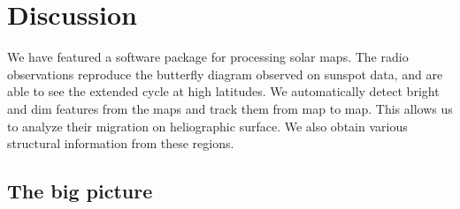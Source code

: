 \documentclass{aa}
\begin{document}
%
%
%

\section{Discussion}\label{sect:discussion}

We have featured a software package for processing solar maps. The radio observations reproduce the butterfly diagram 
observed on sunspot data, and are able to see the extended cycle at high latitudes. We automatically detect bright and 
dim features from the maps and track them from map to map. This allows us to analyze their migration on heliographic 
surface. We also obtain various structural information from these regions.

\subsection{The big picture}
\end{document}
